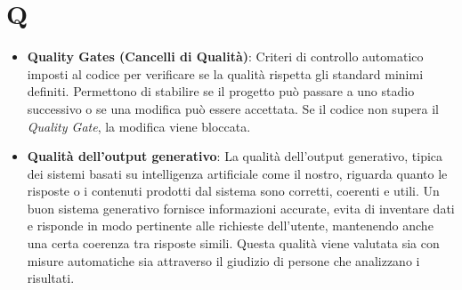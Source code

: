 \documentclass[11pt,a4paper]{article}
\begin{document}
\section*{Q}
\begin{itemize}
\item \textbf{Quality Gates (Cancelli di Qualità)}: Criteri di controllo automatico imposti al codice per verificare se la qualità rispetta gli standard minimi definiti. Permettono di stabilire se il progetto può passare a uno stadio successivo o se una modifica può essere accettata. Se il codice non supera il \textit{Quality Gate}, la modifica viene bloccata.

\item \textbf{Qualità dell'output generativo}: La qualità dell’output generativo, tipica dei sistemi basati su intelligenza artificiale come il nostro, riguarda quanto le risposte o i contenuti prodotti dal sistema sono corretti, coerenti e utili. Un buon sistema generativo fornisce informazioni accurate, evita di inventare dati e risponde in modo pertinente alle richieste dell’utente, mantenendo anche una certa coerenza tra risposte simili. Questa qualità viene valutata sia con misure automatiche sia attraverso il giudizio di persone che analizzano i risultati.

\end{itemize}

\newpage
\end{document}
